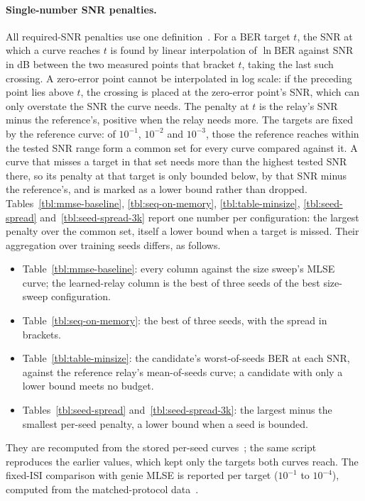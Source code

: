 \paragraph{Single-number SNR penalties.} All required-SNR penalties use one definition~. For a BER target $t$, the SNR at which a curve reaches $t$ is found by linear interpolation of $\ln \mathrm{BER}$ against SNR in dB between the two measured points that bracket $t$, taking the last such crossing. A zero-error point cannot be interpolated in log scale: if the preceding point lies above $t$, the crossing is placed at the zero-error point's SNR, which can only overstate the SNR the curve needs. The penalty at $t$ is the relay's SNR minus the reference's, positive when the relay needs more. The targets are fixed by the reference curve: of $10^{-1}$, $10^{-2}$ and $10^{-3}$, those the reference reaches within the tested SNR range form a common set for every curve compared against it. A curve that misses a target in that set needs more than the highest tested SNR there, so its penalty at that target is only bounded below, by that SNR minus the reference's, and is marked as a lower bound rather than dropped. Tables~\ref{tbl:mmse-baseline}, \ref{tbl:seq-on-memory}, \ref{tbl:table-minsize}, \ref{tbl:seed-spread} and~\ref{tbl:seed-spread-3k} report one number per configuration: the largest penalty over the common set, itself a lower bound when a target is missed. Their aggregation over training seeds differs, as follows.
\begin{itemize}
\tightlist
\item Table~\ref{tbl:mmse-baseline}: every column against the size sweep's MLSE curve; the learned-relay column is the best of three seeds of the best size-sweep configuration.
\item Table~\ref{tbl:seq-on-memory}: the best of three seeds, with the spread in brackets.
\item Table~\ref{tbl:table-minsize}: the candidate's worst-of-seeds BER at each SNR, against the reference relay's mean-of-seeds curve; a candidate with only a lower bound meets no budget.
\item Tables~\ref{tbl:seed-spread} and~\ref{tbl:seed-spread-3k}: the largest minus the smallest per-seed penalty, a lower bound when a seed is bounded.
\end{itemize}
They are recomputed from the stored per-seed curves~; the same script reproduces the earlier values, which kept only the targets both curves reach. The fixed-ISI comparison with genie MLSE is reported per target ($10^{-1}$ to $10^{-4}$), computed from the matched-protocol data~.


